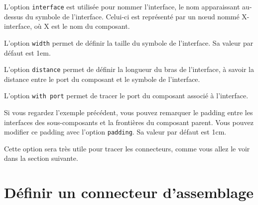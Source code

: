 \documentclass[a4paper,11pt]{report}
\newcommand{\inputTikZ}[1]{%
  }%
\newcommand{\inputTikZ}[1]{%
    \texttt{[image: fig/\#1.pdf]}%
  }%
\begin{document}
\medskip

\begin{minipage}{0.45\textwidth}

\end{minipage}
\begin{minipage}{0.55\textwidth}
\begin{center}
\inputTikZ{componentinterface}
\end{center}
\end{minipage}

\medskip

L'option {\tt interface} est utilisée pour nommer l'interface, le nom apparaissant au-dessus du symbole de l'interface.
Celui-ci est représenté par un n\oe{}ud nommé X-interface, où X est le nom du composant.

\medskip

L'option {\tt width} permet de définir la taille du symbole de l'interface. Sa valeur par défaut est 1em.

\medskip

L'option {\tt distance} permet de définir la longueur du bras de l'interface, à savoir la distance entre le port du composant et le symbole de l'interface.

\medskip

L'option {\tt with port} permet de tracer le port du composant associé à l'interface.

\medskip

Si vous regardez l'exemple précédent, vous pouvez remarquer le padding entre les interfaces des sous-composants et la frontières du composant parent. Vous pouvez modifier ce padding avec l'option {\tt padding}. Sa valeur par défaut est 1cm. 

\medskip

\begin{minipage}{0.45\textwidth}

\end{minipage}
\begin{minipage}{0.55\textwidth}
\begin{center}
\inputTikZ{componentinterfacepadding}
\end{center}
\end{minipage}

\medskip

Cette option sera très utile pour tracer les connecteurs, comme vous allez le voir dans la section suivante.

\section{Définir un connecteur d'assemblage}
\end{document}
